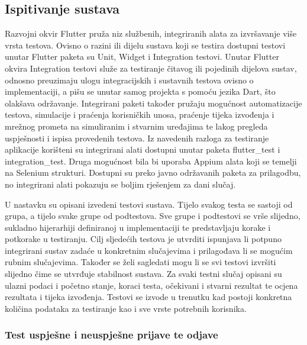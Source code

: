 			
			\subsection{Ispitivanje sustava}
			
			 {Razvojni okvir Flutter pruža niz službenih, integriranih alata za izvršavanje više vrsta testova. Ovisno o razini ili dijelu sustava koji se testira dostupni testovi unutar Flutter paketa su Unit, Widget i Integration testovi. Unutar Flutter okvira Integration testovi služe za testiranje čitavog ili pojedinih dijelova sustav, odnosno preuzimaju ulogu integracijskih i sustavnih testova ovisno o implementaciji, a pišu se unutar samog projekta s pomoću jezika Dart, što olakšava održavanje. Integrirani paketi također pružaju mogućnost automatizacije testova, simulacije i praćenja korisničkih unosa, praćenje tijeka izvođenja i mrežnog prometa na simuliranim i stvarnim uređajima te lakog pregleda uspješnosti i ispisa provedenih testova. Iz navedenih razloga za testiranje aplikacije korišteni su integrirani alati dostupni unutar paketa flutter\_test i integration\_test. Druga mogućnost bila bi uporaba Appium alata koji se temelji na Selenium strukturi. Dostupni su preko javno održavanih paketa za prilagodbu, no integrirani alati pokazuju se boljim rješenjem za dani slučaj.}
			 
			 {U nastavku su opisani izvedeni testovi sustava. Tijelo svakog testa se sastoji od grupa, a tijelo svake grupe od podtestova. Sve grupe i podtestovi se vrše slijedno, sukladno hijerarhiji definiranoj u implementaciji te predstavljaju korake i potkorake u testiranju. Cilj sljedećih testova je utvrditi ispunjava li potpuno integrirani sustav zadaće u konkretnim slučajevima i prilagođava li se mogućim rubnim slučajevima. Također se želi sagledati mogu li se svi testovi izvršiti slijedno čime se utvrđuje stabilnost sustava. Za svaki testni slučaj opisani su ulazni podaci i početno stanje, koraci testa, očekivani i stvarni rezultat te ocjena rezultata i tijeka izvođenja. Testovi se izvode u trenutku kad postoji konkretna količina podataka za testiranje kao i sve vrste potrebnih korisnika.}
			 
			 \subsubsection{Test uspješne i neuspješne prijave te odjave}
			 
